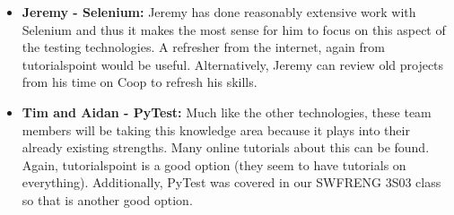 \documentclass[12pt, titlepage]{article}
\begin{document}
\begin{enumerate}
\begin{itemize}
    \item \textbf{Jeremy - Selenium: }Jeremy has done reasonably extensive work with Selenium and thus it makes the most sense for him to focus on this aspect of the testing technologies. A refresher from the internet, again from tutorialspoint would be useful. Alternatively, Jeremy can review old projects from his time on Coop to refresh his skills.

    \item \textbf{Tim and Aidan - PyTest: }Much like the other technologies, these team members will be taking this knowledge area because it plays into their already existing strengths. Many online tutorials about this can be found. Again, tutorialspoint is a good option (they seem to have tutorials on everything). Additionally, PyTest was covered in our SWFRENG 3S03 class so that is another good option.

  \end{itemize}
\end{enumerate}
\end{document}
